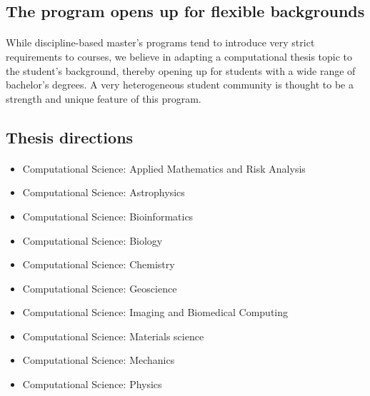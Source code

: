 \documentclass[%
oneside,                 %
final,                   %
10pt]{article}
\begin{document}
\subsection{The program opens up for flexible backgrounds}


\paragraph{}
While discipline-based master's programs tend to introduce very strict
requirements to courses, we believe in adapting a computational thesis
topic to the student's background, thereby opening up for
students with a wide range of bachelor's degrees.
A very heterogeneous student community is thought to be a strength and
unique feature of this program.



\subsection{Thesis directions}

\paragraph{}

\begin{itemize}
\item Computational Science: Applied Mathematics and Risk Analysis

\item Computational Science: Astrophysics

\item Computational Science: Bioinformatics

\item Computational Science: Biology

\item Computational Science: Chemistry

\item Computational Science: Geoscience

\item Computational Science: Imaging and Biomedical Computing

\item Computational Science: Materials science

\item Computational Science: Mechanics

\item Computational Science: Physics
\end{itemize}
\end{document}
